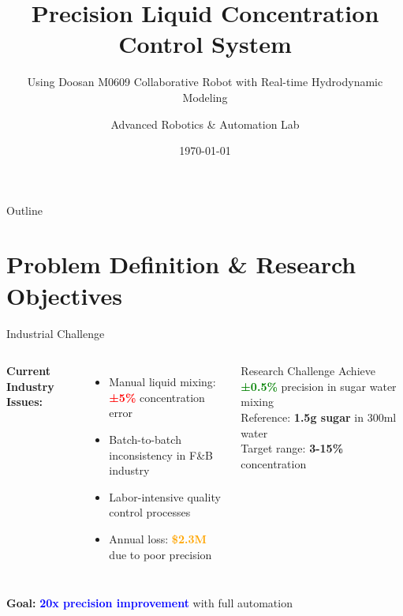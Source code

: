 \documentclass[aspectratio=169]{beamer}
\title{Precision Liquid Concentration Control System}
\subtitle{Using Doosan M0609 Collaborative Robot with Real-time Hydrodynamic Modeling}
\author{Advanced Robotics \& Automation Lab}
\date{\today}
\institute{Industrial Automation Research Center}
\begin{document}
\maketitle

\begin{frame}{Outline}
    \tableofcontents
\end{frame}

\section{Problem Definition \& Research Objectives}

\begin{frame}{Industrial Challenge}
\begin{columns}[T]
\textbf{Current Industry Issues:}
\begin{itemize}
    \item Manual liquid mixing: \textcolor{red}{\textbf{±5\%}} concentration error
    \item Batch-to-batch inconsistency in F\&B industry
    \item Labor-intensive quality control processes
    \item Annual loss: \textcolor{orange}{\textbf{\$2.3M}} due to poor precision
\end{itemize}

\begin{alertblock}{Research Challenge}
Achieve \textcolor{green}{\textbf{±0.5\%}} precision in sugar water mixing\\
Reference: \textbf{1.5g sugar} in 300ml water\\
Target range: \textbf{3-15\%} concentration
\end{alertblock}
\end{columns}

\vspace{1em}
\begin{center}
\textbf{Goal:} \textcolor{blue}{\textbf{20x precision improvement}} with full automation
\end{center}
\end{frame}
\end{document}
